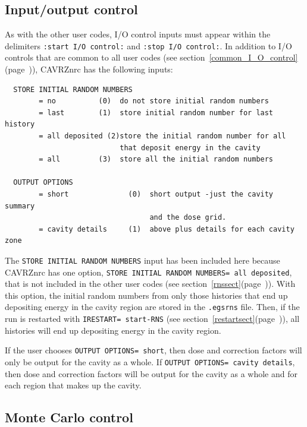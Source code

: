 \documentclass[12pt,twoside]{article}  %
\newcommand{\lpage}[1]{(page~\pageref{#1})}
\begin{document}
\subsection{Input/output control}
\label{cavrziosect}

As with the other user codes, I/O control inputs must appear within
the delimiters {\tt :start I/O control:} and {\tt :stop I/O control:}.
In addition to I/O controls that are common to all user codes (see
section~\ref{common_I_O_control}\lpage{common_I_O_control}), CAVRZnrc
has the following inputs:
\begin{verbatim}
  STORE INITIAL RANDOM NUMBERS
        = no          (0)  do not store initial random numbers
        = last        (1)  store initial random number for last history
        = all deposited (2)store the initial random number for all
                           that deposit energy in the cavity
        = all         (3)  store all the initial random numbers

  OUTPUT OPTIONS
        = short              (0)  short output -just the cavity summary
                                  and the dose grid.
        = cavity details     (1)  above plus details for each cavity zone
\end{verbatim}
The {\tt STORE INITIAL RANDOM NUMBERS} input has been included here because
CAVRZnrc has one option, {\tt STORE INITIAL RANDOM NUMBERS= all deposited},
that is not included in the other user codes (see
section~\ref{rnssect}\lpage{rnssect}).
With this option, the initial random numbers from only those histories that
end up depositing energy in the cavity region are stored in the
{\tt .egsrns} file.  Then, if the run is restarted with
{\tt IRESTART= start-RNS} (see section~\ref{restartsect}\lpage{restartsect}), 
all histories will end up depositing energy in the cavity region. 

If the user chooses {\tt OUTPUT OPTIONS= short}, then dose and correction
factors will only be output for the cavity as a whole.  If 
{\tt OUTPUT OPTIONS= cavity details}, then dose and correction factors
will be output for the cavity as a whole and for each region that makes up
the cavity. 

\subsection{Monte Carlo control}
 
\end{document}
